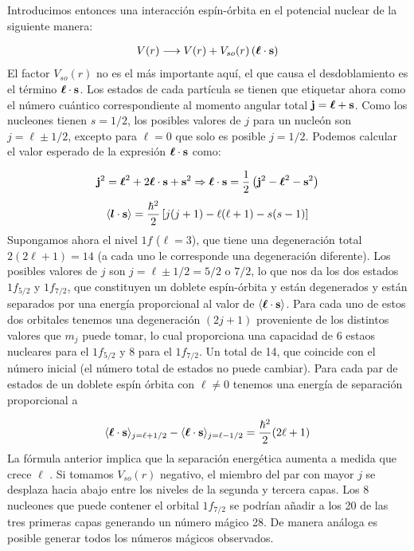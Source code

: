 Introducimos entonces una interacción espín-órbita en el potencial nuclear de la siguiente manera:

\begin{eqnarray}
    V(r) \longrightarrow V(r) + V_{so} (r) \left( \boldsymbol{\ell} \cdot \mathbf{s} \right)
\end{eqnarray}
El factor $V_{so} (r)$ no es el más importante aquí, el que causa el desdoblamiento es el término $\boldsymbol{\ell}\cdot\mathbf{s}$. Los estados de cada partícula se tienen que etiquetar ahora como el número cuántico correspondiente al momento angular total $\mathbf{j} =\boldsymbol{\ell}+\mathbf{s}$. Como los nucleones tienen $s=1/2$, los posibles valores de $j$ para un nucleón son $j=\ell\pm 1/2$, excepto para $\ell=0$ que solo es posible $j=1/2$. Podemos calcular el valor esperado de la expresión $\boldsymbol{\ell} \cdot \mathbf{s}$ como:

\begin{eqnarray}
    \mathbf{j}^2 = \boldsymbol{\ell}^2 + 2 \boldsymbol{\ell}\cdot\mathbf{s} + \mathbf{s}^2 \Rightarrow \boldsymbol{\ell} \cdot \mathbf{s} = \frac{1}{2} \left( \mathbf{j}^2 -\boldsymbol{\ell}^2 -\mathbf{s}^2 \right)     
\end{eqnarray}
\begin{eqnarray}
    \langle \boldsymbol{l} \cdot \mathbf{s} \rangle = \frac{\hbar^2}{2} \left[ j(j+1)-\ell(\ell+1) - s(s-1) \right]
\end{eqnarray}
Supongamos ahora el nivel $1f$ ($\ell = 3$), que tiene una degeneración total $2(2\ell+1)=14$ (a cada uno le corresponde una degeneración diferente). Los posibles valores de $j$ son $j=\ell \pm 1/2=5/2$ o $7/2$, lo que nos da los dos estados $1f_{5/2}$ y $1f_{7/2}$, que constituyen un doblete espín-órbita y están degenerados y están separados por una energía proporcional al valor de $\langle \boldsymbol{\ell} \cdot \mathbf{s} \rangle$. Para cada uno de estos dos orbitales tenemos una degeneración $(2j+1)$ proveniente de los distintos valores que $m_j$ puede tomar, lo cual proporciona una capacidad de 6 estaos nucleares para el $1f_{5/2}$ y 8 para el $1f_{7/2}$. Un total de 14, que coincide con el número inicial (el número total de estados no puede cambiar). Para cada par de estados de un doblete espín órbita con $\ell \neq 0$ tenemos una energía de separación proporcional a

\begin{eqnarray}
	\langle \boldsymbol{\ell} \cdot \mathbf{s} \rangle_{j=\ell+1/2} - \langle \boldsymbol{\ell} \cdot \mathbf{s} \rangle_{j=\ell-1/2} = \frac{\hbar^2}{2} (2\ell +1)
\end{eqnarray}
La fórmula anterior implica que la separación energética aumenta a medida que crece $\ell$ . Si tomamos $V_{so} (r)$ negativo, el miembro del par con mayor $j$ se desplaza hacia abajo entre los niveles de la segunda y tercera capas. Los 8 nucleones que puede contener el orbital $1f_{7/2}$ se podrían añadir a los 20 de las tres primeras capas generando un número mágico 28. De manera análoga es posible generar todos los números mágicos observados. \\

